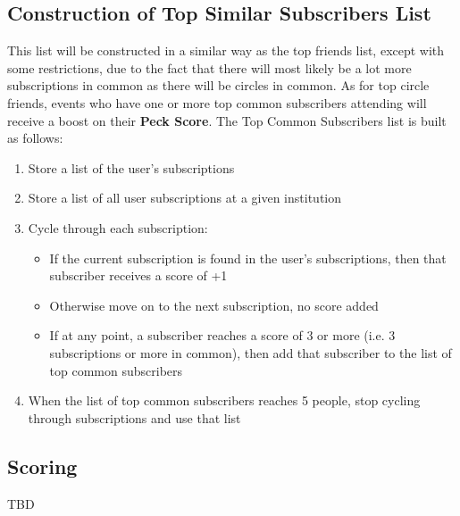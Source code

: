 \documentclass[12pt]{amsart}
\begin{document}
\medskip

\subsection*{Construction of Top Similar Subscribers List}

This list will be constructed in a similar way as the top friends list, except with some restrictions, due to the fact that there will most likely be a lot more subscriptions in common as there will be circles in common. As for top circle friends, events who have one or more top common subscribers attending will receive a boost on their \textbf{Peck Score}. The Top Common Subscribers list is built as follows:

\begin{enumerate}
	\item Store a list of the user's subscriptions
	\item Store a list of all user subscriptions at a given institution
	\item Cycle through each subscription:
		\begin{itemize}
			\item If the current subscription is found in the user's subscriptions, then that subscriber receives a score of +1
			\item Otherwise move on to the next subscription, no score added
			\item If at any point, a subscriber reaches a score of 3 or more (i.e. 3 subscriptions or more in common), then add that subscriber to the list of top common subscribers
		\end{itemize}
	\item When the list of top common subscribers reaches 5 people, stop cycling through subscriptions and use that list
\end{enumerate}

\medskip

\subsection*{Scoring}

TBD
\end{document}
